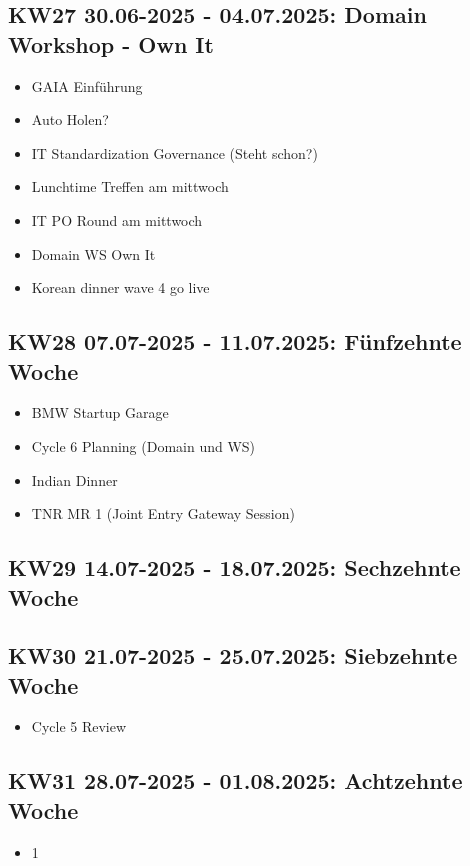\subsection{KW27 30.06-2025 - 04.07.2025: Domain Workshop - Own It}
\begin{itemize}
  \item GAIA Einführung
  \item Auto Holen?
  \item IT Standardization Governance (Steht schon?)
  \item Lunchtime Treffen am mittwoch
  \item IT PO Round am mittwoch
  \item Domain WS Own It
  \item Korean dinner wave 4 go live
\end{itemize}


\subsection{KW28 07.07-2025 - 11.07.2025: Fünfzehnte Woche}
\begin{itemize}
  \item BMW Startup Garage
  \item Cycle 6 Planning (Domain und WS)
  \item Indian Dinner
  \item TNR MR 1 (Joint Entry Gateway Session)
\end{itemize}


\subsection{KW29 14.07-2025 - 18.07.2025: Sechzehnte Woche}


\subsection{KW30 21.07-2025 - 25.07.2025: Siebzehnte Woche}
\begin{itemize}
  \item Cycle 5 Review
\end{itemize}


\subsection{KW31 28.07-2025 - 01.08.2025: Achtzehnte Woche}
\begin{itemize}
  \item 1
\end{itemize}


